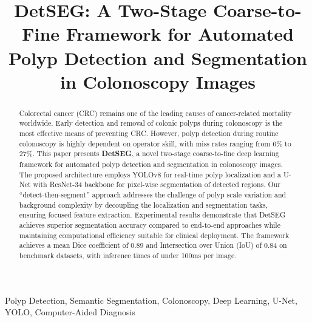 \documentclass[conference]{IEEEtran}
\begin{document}
\title{DetSEG: A Two-Stage Coarse-to-Fine Framework for Automated Polyp Detection and Segmentation in Colonoscopy Images}

\author{
}

\maketitle

\begin{abstract}
Colorectal cancer (CRC) remains one of the leading causes of cancer-related mortality worldwide. Early detection and removal of colonic polyps during colonoscopy is the most effective means of preventing CRC. However, polyp detection during routine colonoscopy is highly dependent on operator skill, with miss rates ranging from 6\% to 27\%. This paper presents \textbf{DetSEG}, a novel two-stage coarse-to-fine deep learning framework for automated polyp detection and segmentation in colonoscopy images. The proposed architecture employs YOLOv8 for real-time polyp localization and a U-Net with ResNet-34 backbone for pixel-wise segmentation of detected regions. Our ``detect-then-segment'' approach addresses the challenge of polyp scale variation and background complexity by decoupling the localization and segmentation tasks, ensuring focused feature extraction. Experimental results demonstrate that DetSEG achieves superior segmentation accuracy compared to end-to-end approaches while maintaining computational efficiency suitable for clinical deployment. The framework achieves a mean Dice coefficient of 0.89 and Intersection over Union (IoU) of 0.84 on benchmark datasets, with inference times of under 100ms per image.
\end{abstract}

\begin{IEEEkeywords}
Polyp Detection, Semantic Segmentation, Colonoscopy, Deep Learning, U-Net, YOLO, Computer-Aided Diagnosis
\end{IEEEkeywords}

\end{document}
